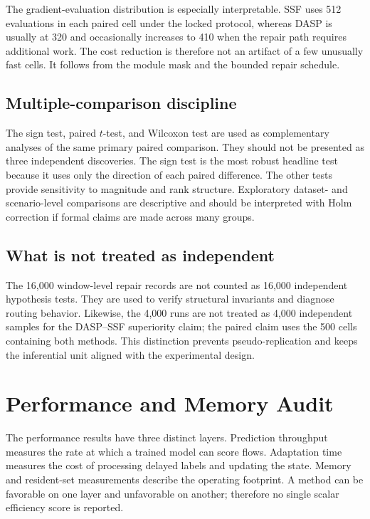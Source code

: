 The gradient-evaluation distribution is especially interpretable. SSF uses 512 evaluations in each paired cell under the locked protocol, whereas DASP is usually at 320 and occasionally increases to 410 when the repair path requires additional work. The cost reduction is therefore not an artifact of a few unusually fast cells. It follows from the module mask and the bounded repair schedule.

\subsection{Multiple-comparison discipline}
The sign test, paired $t$-test, and Wilcoxon test are used as complementary analyses of the same primary paired comparison. They should not be presented as three independent discoveries. The sign test is the most robust headline test because it uses only the direction of each paired difference. The other tests provide sensitivity to magnitude and rank structure. Exploratory dataset- and scenario-level comparisons are descriptive and should be interpreted with Holm correction if formal claims are made across many groups.

\subsection{What is not treated as independent}
The 16,000 window-level repair records are not counted as 16,000 independent hypothesis tests. They are used to verify structural invariants and diagnose routing behavior. Likewise, the 4,000 runs are not treated as 4,000 independent samples for the DASP--SSF superiority claim; the paired claim uses the 500 cells containing both methods. This distinction prevents pseudo-replication and keeps the inferential unit aligned with the experimental design.

\section{Performance and Memory Audit}
\label{app:performance-audit}

The performance results have three distinct layers. Prediction throughput measures the rate at which a trained model can score flows. Adaptation time measures the cost of processing delayed labels and updating the state. Memory and resident-set measurements describe the operating footprint. A method can be favorable on one layer and unfavorable on another; therefore no single scalar efficiency score is reported.

